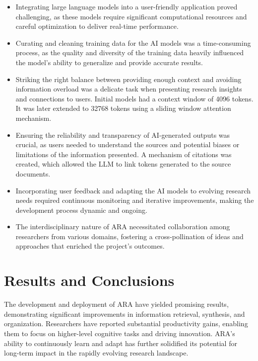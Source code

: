 \documentclass{article}
\begin{document}
\begin{itemize}
    \item Integrating large language models into a user-friendly application proved challenging, as these models require significant computational resources and careful optimization to deliver real-time performance.
    
    \item Curating and cleaning training data for the AI models was a time-consuming process, as the quality and diversity of the training data heavily influenced the model's ability to generalize and provide accurate results.
    
    \item Striking the right balance between providing enough context and avoiding information overload was a delicate task when presenting research insights and connections to users. Initial models had a context window of 4096 tokens. It was later extended to 32768 tokens using a sliding window attention mechanism.
    
    \item Ensuring the reliability and transparency of AI-generated outputs was crucial, as users needed to understand the sources and potential biases or limitations of the information presented. A mechanism of citations was created, which allowed the LLM to link tokens generated to the source documents.
    
    \item Incorporating user feedback and adapting the AI models to evolving research needs required continuous monitoring and iterative improvements, making the development process dynamic and ongoing.
    
    \item The interdisciplinary nature of ARA necessitated collaboration among researchers from various domains, fostering a cross-pollination of ideas and approaches that enriched the project's outcomes.
\end{itemize}


\section*{Results and Conclusions}
The development and deployment of ARA have yielded promising results, demonstrating significant improvements in information retrieval, synthesis, and organization. Researchers have reported substantial productivity gains, enabling them to focus on higher-level cognitive tasks and driving innovation. ARA's ability to continuously learn and adapt has further solidified its potential for long-term impact in the rapidly evolving research landscape.
\end{document}
